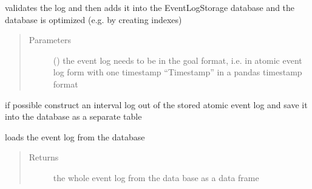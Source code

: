 \documentclass[letterpaper,10pt,english]{sphinxmanual}
\begin{document}
\begin{fulllineitems}
\begin{fulllineitems}
\label{\detokenize{event_log_analyzer:event_log_analyzer.event_log.EventLogStorage.add_new_dataframe}}
\sphinxAtStartPar
validates the log and then adds it into the EventLogStorage database and the database is optimized (e.g. by creating indexes)
\begin{quote}\begin{description}
\item[{Parameters}] \leavevmode
\sphinxAtStartPar
{} () \textendash{} the event log needs to be in the goal format, i.e. in atomic event log form with one timestamp “Timestamp” in a pandas timestamp format

\end{description}\end{quote}

\end{fulllineitems}


\begin{fulllineitems}
\label{\detokenize{event_log_analyzer:event_log_analyzer.event_log.EventLogStorage.create_interval_log}}
\sphinxAtStartPar
if possible construct an interval log out of the stored atomic event log and save it into the database as a separate table

\end{fulllineitems}


\begin{fulllineitems}
\label{\detokenize{event_log_analyzer:event_log_analyzer.event_log.EventLogStorage.get_event_log}}
\sphinxAtStartPar
loads the event log from the database
\begin{quote}\begin{description}
\item[{Returns}] \leavevmode
\sphinxAtStartPar
{} \textendash{} the whole event log from the data base as a data frame


\end{description}
\end{quote}
\end{fulllineitems}
\end{fulllineitems}
\end{document}
